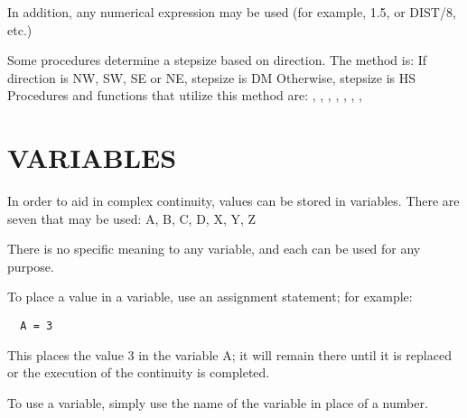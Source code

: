 In addition, any numerical expression may be used (for example, 1.5, or
DIST/8, etc.)

Some procedures determine a stepsize based on direction.  The method is:
  If direction is NW, SW, SE or NE, stepsize is DM
  Otherwise,                        stepsize is HS
Procedures and functions that utilize this method are:
  , ,
, ,
, , ,

\section{VARIABLES}\label{variables}

In order to aid in complex continuity, values can be stored in variables.
There are seven that may be used:
  A, B, C, D, X, Y, Z

There is no specific meaning to any variable, and each can be used for any
purpose.

To place a value in a variable, use an assignment statement; for example:
\begin{verbatim}
  A = 3
\end{verbatim}
This places the value 3 in the variable A; it will remain there until it is
replaced or the execution of the continuity is completed.

To use a variable, simply use the name of the variable in place of a number.
